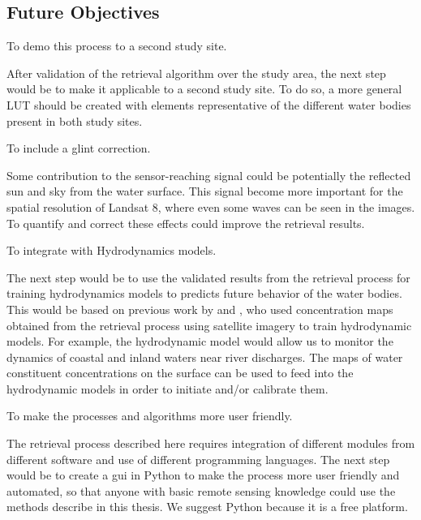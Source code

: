\subsection{Future Objectives}
	\begin{enumerate}

			{\bf \item To demo this process to a second study site.}

After validation of the retrieval algorithm over the study area, the next step would be to make it applicable to a second study site. To do so, a more general LUT should be created with elements representative of the different water bodies present in both study sites.

			{\bf \item To include a glint correction.}

Some contribution to the sensor-reaching signal could be potentially the reflected sun and sky from the water surface. This signal become more important for the spatial resolution of Landsat 8, where even some waves can be seen in the images. To quantify and correct these effects could improve the retrieval results.

			{\bf \item To integrate with Hydrodynamics models.} 

The next step would be to use the validated results from the retrieval process for training hydrodynamics models to predicts future behavior of the water bodies. This would be based on previous work by \citet{Pahlevan:2012} and \citet{GeraceThesis}, who used concentration maps obtained from the retrieval process using satellite imagery to train hydrodynamic models. For example, the hydrodynamic model would allow us to monitor the dynamics of coastal and inland waters near river discharges. The maps of water constituent concentrations on the surface can be used to feed into the hydrodynamic models in order to initiate and/or calibrate them. 

			{\bf \item To make the processes and algorithms more user friendly.} 

The retrieval process described here requires integration of different modules from different software and use of different programming languages. The next step would be to create a \gls{gui} in Python to make the process more user friendly and automated, so that anyone with basic remote sensing knowledge could use the methods describe in this thesis. We suggest Python because it is a free platform.


\end{enumerate}
